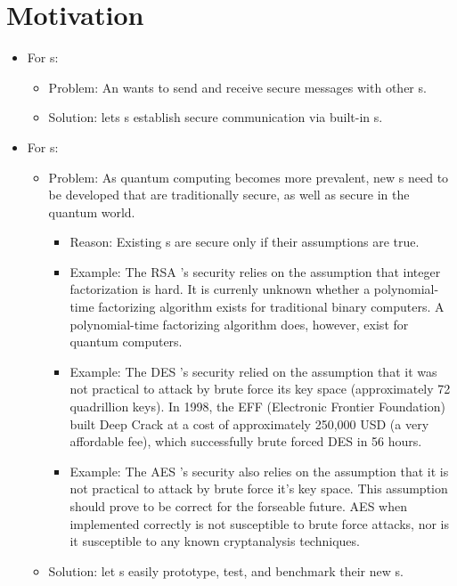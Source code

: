 
\section{Motivation}

\begin{itemize}
\item For \eu s:
  \begin{itemize}
  \item Problem: An \eu{} wants to send and receive
    secure messages with other \eu s.
  \item Solution: \cry{} lets \eu s establish
    secure communication via built-in \cs s.
  \end{itemize}
\item For \cg s:
  \begin{itemize}
  \item Problem: As quantum computing becomes more prevalent,
  new \cs s need to be developed that are traditionally secure,
  as well as secure in the quantum world.
    \begin{itemize}
    \item Reason: Existing \cs s are secure
      only if their assumptions are true.
    \item Example: The RSA \cs's security relies on
      the assumption that integer factorization is hard.
      It is currenly unknown whether a polynomial-time
      factorizing algorithm exists for traditional binary
      computers. A polynomial-time factorizing algorithm
      does, however, exist for quantum computers.
    \item Example: The DES \cs's security relied on the assumption
      that it was not practical to attack by brute force its key space
      (approximately 72 quadrillion keys). In 1998, the EFF (Electronic
      Frontier Foundation) built Deep Crack at a cost of approximately
      250,000 USD (a very affordable fee), which successfully brute
      forced DES in 56 hours.
    \item Example: The AES \cs's security also relies on the assumption
      that it is not practical to attack by brute force it's key space.
      This assumption should prove to be correct for the forseable future.
      AES when implemented correctly is not susceptible to brute force attacks,
      nor is it susceptible to any known cryptanalysis techniques.
    \end{itemize}
  \item Solution: \cry{} let \cg s easily prototype, test,
    and benchmark their new \cs s.
  \end{itemize}
\end{itemize}
